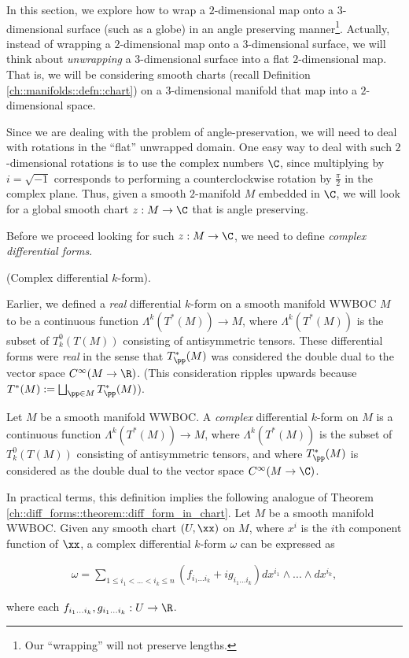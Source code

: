 In this section, we explore how to wrap a $2$-dimensional map onto a $3$-dimensional surface (such as a globe) in an angle preserving manner\footnote{Our ``wrapping'' will not preserve lengths.}. Actually, instead of wrapping a $2$-dimensional map onto a $3$-dimensional surface, we will think about \textit{unwrapping} a $3$-dimensional surface into a flat $2$-dimensional map. That is, we will be considering smooth charts (recall Definition \ref{ch::manifolds::defn::chart}) on a $3$-dimensional manifold that map into a $2$-dimensional space.

Since we are dealing with the problem of angle-preservation, we will need to deal with rotations in the ``flat'' unwrapped domain. One easy way to deal with such $2$-dimensional rotations is to use the complex numbers $\C$, since multiplying by $i = \sqrt{-1}$ corresponds to performing a counterclockwise rotation by $\frac{\pi}{2}$ in the complex plane. Thus, given a smooth $2$-manifold $M$ embedded in $\C$, we will look for a global smooth chart $z:M \rightarrow \C$ that is angle preserving.

Before we proceed looking for such $z:M \rightarrow \C$, we need to define \textit{complex differential forms}.

\begin{defn}
    (Complex differential $k$-form).
    
    Earlier, we defined a \textit{real} differential $k$-form on a smooth manifold WWBOC $M$ to be a continuous function $\Lambda^k(T^*(M)) \rightarrow M$, where $\Lambda^k(T^*(M))$ is the subset of $T^0_k(T(M))$ consisting of antisymmetric tensors. These differential forms were \textit{real} in the sense that $T_\pp^*(M)$ was considered the double dual to the vector space $C^\infty(M \rightarrow \R)$. (This consideration ripples upwards because $T^*(M) := \bigsqcup_{\pp \in M} T_\pp^*(M)$).
    
    Let $M$ be a smooth manifold WWBOC. A \textit{complex} differential $k$-form on $M$ is a continuous function $\Lambda^k(T^*(M)) \rightarrow M$, where $\Lambda^k(T^*(M))$ is the subset of $T^0_k(T(M))$ consisting of antisymmetric tensors, and where $T_\pp^*(M)$ is considered as the double dual to the vector space $C^\infty(M \rightarrow \C)$.
    
    In practical terms, this definition implies the following analogue of Theorem \ref{ch::diff_forms::theorem::diff_form_in_chart}. Let $M$ be a smooth manifold WWBOC. Given any smooth chart $(U, \xx)$ on $M$, where $x^i$ is the $i$th component function of $\xx$, a complex differential $k$-form $\omega$ can be expressed as

    \begin{align*}
        \omega = \sum_{1 \leq i_1 < ... < i_k \leq n} (f_{i_1...i_k} + i g_{i_1 ... i_k}) dx^{i_1} \wedge ... \wedge dx^{i_k},
    \end{align*}
    
    where each $f_{i_1...i_k}, g_{i_1...i_k}:U \rightarrow \R$.
\end{defn}


